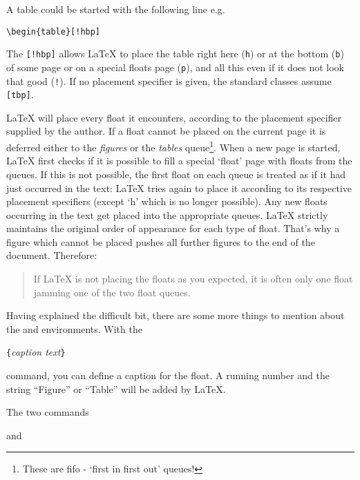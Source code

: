 \pagebreak[3]
A table could be started with the following line e.g.{}
\begin{code}
\verb|\begin{table}[!hbp]|
\end{code}
\noindent The  \verb|[!hbp]| allows \LaTeX{} to 
place the table right here (\texttt{h}) or at the bottom (\texttt{b}) 
of some page
or on a special floats page (\texttt{p}), and all this even if it does not
look that good (\texttt{!}). If no placement specifier is given, the standard
classes assume \verb|[tbp]|.

\LaTeX{} will place every float it encounters, according to the
placement specifier supplied by the author. If a float cannot be
placed on the current page it is deferred either to the
\emph{figures} or the \emph{tables} queue\footnote{These are fifo -
  `first in first out' queues!}.  When a new page is started,
\LaTeX{} first checks if it is possible to fill a special `float'
page with floats from the queues. If this is not possible, the first
float on each queue is treated as if it had just occurred in the
text: \LaTeX{} tries again to place it according to its
respective placement specifiers (except `h' which is no longer
possible).  Any new floats occurring in the text get placed into the
appropriate queues. \LaTeX{} strictly maintains the original order of
appearance for each type of float. That's why a figure which cannot
be placed pushes all further figures to the end of the document.
Therefore:

\begin{quote}
If \LaTeX{} is not placing the floats as you expected,
it is often only one float jamming one of the two float queues.
\end{quote}                 

\bigskip
\noindent Having explained the difficult bit, there are some more things to
mention about the  and  environments.
With the 

\begin{command}
\verb|{|\emph{caption text}\verb|}|
\end{command}

\noindent command, you can define a caption for the float. A running number and
the string ``Figure'' or ``Table'' will be added by \LaTeX.

The two commands

\begin{command}
 and  
\end{command}

